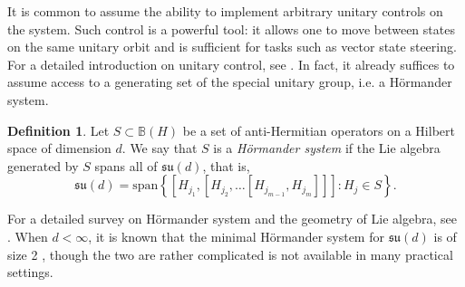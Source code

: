 \documentclass[11pt,reqno]{amsart}
\theoremstyle{definition}
\newtheorem{definition}[theorem]{Definition}
\newcommand{\mb}{\mathbb}
\newcommand{\mf}{\mathfrak}
\newcommand{\lset}{\left\{ }
\newcommand{\rset}{\right\} }
\begin{document}
It is common to assume the ability to implement arbitrary unitary controls on the system. Such control is a powerful tool: it allows one to move between states on the same unitary orbit and is sufficient for tasks such as vector state steering. For a detailed introduction on unitary control, see \cite{dalessandro2021}. In fact, it already suffices to assume access to a generating set of the special unitary group, i.e. a Hörmander system.

\begin{definition}
    Let $S \subset \mb{B}(H)$ be a set of anti-Hermitian operators on a Hilbert space of dimension $d$. We say that $S$ is a \emph{Hörmander system} if the Lie algebra generated by $S$ spans all of $\mathfrak{su}(d)$, that is,
    $$\mf{su}(d) = \text{span} \lset  [H_{j_1}, [H_{j_2}, \dots [H_{j_{m-1}}, H_{j_m}]]] : H_j \in S \rset.$$
\end{definition}
For a detailed survey on Hörmander system and the geometry of Lie algebra, see \cite{hormander}. When $d<\infty$, it is known that the minimal Hörmander system for $\mf{su}(d)$ is of size 2 \cite{kuranishi1951}, though the two are rather complicated is not available in many practical settings.
\end{document}
